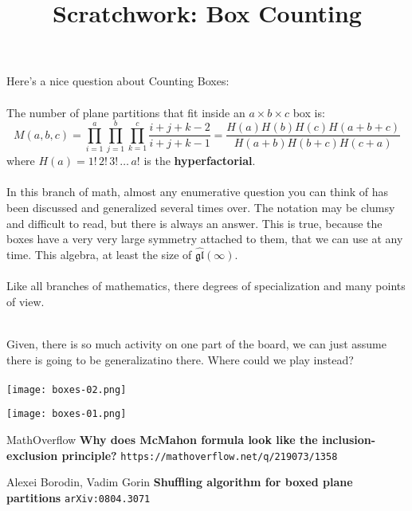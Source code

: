 \documentclass[12pt]{article}
\title{Scratchwork: Box Counting}
\date{}
\begin{document}

\sffamily

\maketitle

\noindent Here's a nice question about Counting Boxes: \\ \\
The number of plane partitions that fit inside an $a \times b \times c$ box is:
$$ M(a,b,c) = \prod_{i=1}^a  \prod_{j=1}^b  \prod_{k=1}^c \frac{i+j+k-2}{i+j+k-1}  = \frac{H(a)H(b)H(c)H(a+b+c)}{H(a+b)H(b+c)H(c+a)}$$
where $H(a) = 1! \,2! \,3!\, \dots \,a!$ is the \textbf{hyperfactorial}. \\ \\
In this branch of math, almost any enumerative question you can think of has been 
discussed and generalized several times over. The notation may be clumsy and difficult 
to read, but there is always an answer.  This is true, because the boxes have a very very large symmetry attached to them, that we can use at any time.  This algebra, at least the size of $\widehat{\mathfrak{gl}}(\infty)$. \\ \\
Like all branches of mathematics, there degrees of specialization and many points of view.  \\ 
 \\ 
Given, there is so much activity on one part of the board, we can just assume there is going to be generalizatino there.  Where could we play instead? \\ \\
\texttt{[image: boxes-02.png]} 

\texttt{[image: boxes-01.png]} 



\vfill

\begin{thebibliography}{}

\item MathOverflow \textbf{Why does McMahon formula look like the inclusion-exclusion principle?} \texttt{https://mathoverflow.net/q/219073/1358}

\item Alexei Borodin, Vadim Gorin \textbf{Shuffling algorithm for boxed plane partitions} \texttt{arXiv:0804.3071}

\end{thebibliography}
\end{document}
